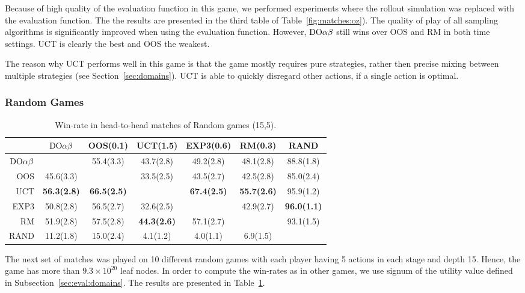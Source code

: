 Because of high quality of the evaluation function in this game, we performed experiments where the rollout simulation was replaced with the evaluation function. 
The the results are presented in the third table of Table~\ref{fig:matches:oz}).
The quality of play of all sampling algorithms is significantly improved when using the evaluation function. 
However, $\textrm{DO}\alpha\beta$ still wins over OOS and RM in both time settings.
UCT is clearly the best and OOS the weakest.

The reason why UCT performs well in this game is that the game mostly requires pure strategies, rather then precise mixing between multiple strategies (see Section~\ref{sec:domains}). UCT is able to quickly disregard other actions, if a single action is optimal.

\subsubsection{Random Games}

\begin{table}
\centering
\begin{scriptsize}

\begin{tabular}{|r|cccccc|}\hline
&$\textrm{DO}\alpha\beta$&OOS(0.1)&UCT(1.5)&EXP3(0.6)&RM(0.3)&RAND\\\hline
$\textrm{DO}\alpha\beta$&&55.4(3.3)&43.7(2.8)&49.2(2.8)&48.1(2.8)&88.8(1.8)\\
OOS&45.6(3.3)&&33.5(2.5)&43.5(2.7)&42.5(2.8)&85.0(2.4)\\
UCT&\textbf{56.3(2.8)}&\textbf{66.5(2.5)}&&\textbf{67.4(2.5)}&\textbf{55.7(2.6)}&95.9(1.2)\\
EXP3&50.8(2.8)&56.5(2.7)&32.6(2.5)&&42.9(2.7)&\textbf{96.0(1.1)}\\
RM&51.9(2.8)&57.5(2.8)&\textbf{44.3(2.6)}&57.1(2.7)&&93.1(1.5)\\
RAND&11.2(1.8)&15.0(2.4)&4.1(1.2)&4.0(1.1)&6.9(1.5)&\\
\hline
\end{tabular}


\end{scriptsize}
\caption{Win-rate in head-to-head matches of Random games (15,5).}\label{fig:matches:rand}
\end{table}


The next set of matches was played on 10 different random games with each player having 5 actions in each stage and depth 15. Hence, the game has more than $9.3\times 10^{20}$ leaf nodes. In order to compute the win-rates as in other games, we use signum of the utility value defined in Subsection~\ref{sec:eval:domains}. The results are presented in Table~\ref{fig:matches:rand}.


